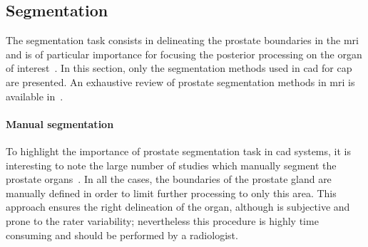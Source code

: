 \subsection{Segmentation}\label{subsec:chp3:img-reg:seg}
The segmentation task consists in delineating the prostate boundaries in the \ac{mri} and is of particular importance for focusing the posterior processing on the organ of interest~\cite{Ghose2012}. 
In this section, only the segmentation methods used in \ac{cad} for \ac{cap} are presented.
An exhaustive review of prostate segmentation methods in \ac{mri} is available in~\cite{Ghose2012}.


\paragraph{Manual segmentation}
To highlight the importance of prostate segmentation task in \ac{cad} systems, it is interesting to note the large number of studies which manually segment the prostate organs~\cite{Artan2009,Artan2010,Matulewicz2013,Niaf2011,Niaf2012,Ozer2009,Ozer2010,Puech2009,Vos2008,Vos2008a,trigui2016classification,trigui2017automatic,lehaire2014computer}.
In all the cases, the boundaries of the prostate gland are manually defined in order to limit further processing to only this area.
This approach ensures the right delineation of the organ, although is subjective and prone to the rater variability; nevertheless this procedure is highly time consuming and should be performed by a radiologist.
